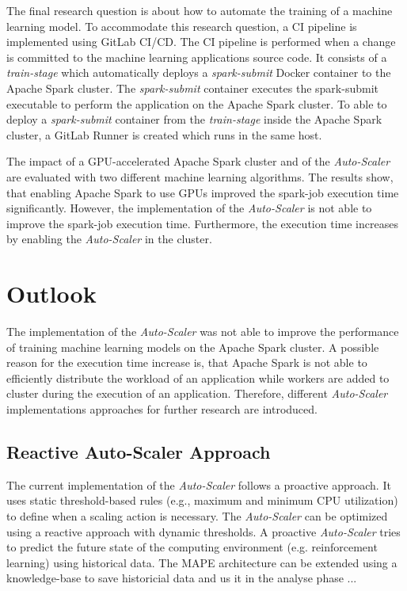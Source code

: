 The final research question is about how to automate the training of a machine learning model.
%
To accommodate this research question, a CI pipeline is implemented using GitLab CI/CD. The CI pipeline is performed when a change is committed to the machine learning applications source code.
It consists of a \textit{train-stage} which automatically deploys a \textit{spark-submit} Docker container to the Apache Spark cluster.
The \textit{spark-submit} container executes the spark-submit executable to perform the application on the Apache Spark cluster.
To able to deploy a \textit{spark-submit} container from the \textit{train-stage} inside the Apache Spark cluster, a GitLab Runner is created which runs in the same host.


The impact of a GPU-accelerated Apache Spark cluster and of the \textit{Auto-Scaler} are evaluated with two different machine learning algorithms.
The results show, that enabling Apache Spark to use GPUs improved the spark-job execution time significantly.
However, the implementation of the \textit{Auto-Scaler} is not able to improve the spark-job execution time. Furthermore, the execution time increases by enabling the \textit{Auto-Scaler} in the cluster.


\section{Outlook}
The implementation of the \textit{Auto-Scaler} was not able to improve the performance of training machine learning models on the Apache Spark cluster.
A possible reason for the execution time increase is, that Apache Spark is not able to efficiently distribute the workload of an application while workers are added to cluster during the execution of an application.
Therefore, different \textit{Auto-Scaler} implementations approaches for further research are introduced.


\subsection{Reactive Auto-Scaler Approach}
The current implementation of the \textit{Auto-Scaler} follows a proactive approach. It uses static threshold-based rules (e.g., maximum and minimum CPU utilization) to define when a scaling action is necessary.
The \textit{Auto-Scaler} can be optimized using a reactive approach with dynamic thresholds. A proactive \textit{Auto-Scaler} tries to predict the future state of the computing environment (e.g. reinforcement learning) using historical data.
The MAPE architecture can be extended using a knowledge-base to save historicial data and us it in the analyse phase ...


